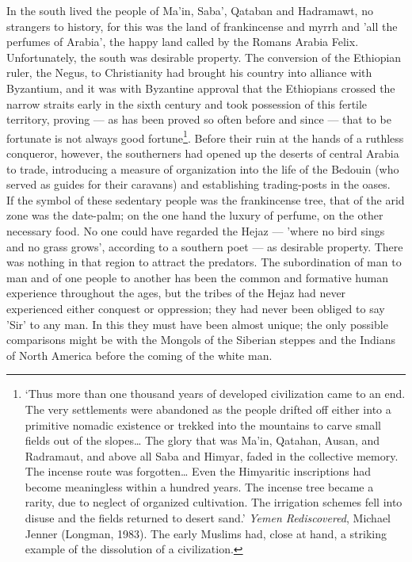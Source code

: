 \documentclass[10pt, twoside]{book}
\begin{document}
In the south lived the people of Ma'in, Saba', Qataban and Hadramawt, no strangers to history, for 
this was the land of frankincense and myrrh and 'all the perfumes of Arabia', the happy land called 
by the Romans Arabia Felix. Unfortunately, the south was desirable property. The conversion of the 
Ethiopian ruler, the Negus, to Christianity had brought his country into alliance with Byzantium, and 
it was with Byzantine approval that the Ethiopians crossed the narrow straits early in the sixth 
century and took possession of this fertile territory, proving --- as has been proved so often before 
and since --- that to be fortunate is not always good fortune\footnote{`Thus more than one thousand years of developed civilization came to an end. The very settlements were abandoned as the people drifted off either into a primitive nomadic existence or trekked into the mountains to carve small fields out of the slopes\ldots{} The glory that was Ma'in, Qatahan, Ausan, and Radramaut, and above all Saba and Himyar, faded in the collective memory. The incense route was forgotten\ldots{} Even the Himyaritic inscriptions had become meaningless within a hundred years. The incense tree became a rarity, due to neglect of organized cultivation. The irrigation schemes fell into disuse and the fields returned to desert sand.' \emph{Yemen Rediscovered}, Michael Jenner (Longman, 1983). The early Muslims had, close at hand, a striking example of the dissolution of a civilization.}. Before their ruin at the hands of a 
ruthless conqueror, however, the southerners had opened up the deserts of central Arabia to trade, 
introducing a measure of organization into the life of the Bedouin (who served as guides for their 
caravans) and establishing trading\hyp{}posts in the oases. \\

If the symbol of these sedentary people was the frankincense tree, that of the arid zone was the 
date\hyp{}palm; on the one hand the luxury of perfume, on the other necessary food. No one could have 
regarded the Hejaz --- 'where no bird sings and no grass grows', according to a southern poet --- as 
desirable property. There was nothing in that region to attract the predators. The subordination of 
man to man and of one people to another has been the common and formative human experience throughout the ages, but the tribes of the Hejaz had never experienced either conquest or oppression; they had never been obliged to say 'Sir' to any man. In this they must have been almost unique; the only 
possible comparisons might be with the Mongols of the Siberian steppes and the Indians of North 
America before the coming of the white man. \\
\end{document}
